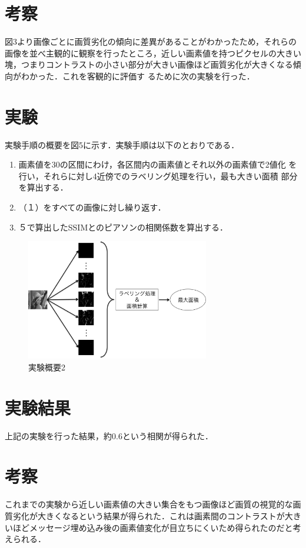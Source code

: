 \documentclass[a4j,fleqn,10pt]{jsarticle}
\begin{document}
\section{考察}
図3より画像ごとに画質劣化の傾向に差異があることがわかったため，それらの
画像を並べ主観的に観察を行ったところ，近しい画素値を持つピクセルの大きい
塊，つまりコントラストの小さい部分が大きい画像ほど画質劣化が大きくなる傾向がわかった．これを客観的に評価す
るために次の実験を行った．

\section{実験}
実験手順の概要を図5に示す．実験手順は以下のとおりである．

\begin{enumerate}
\renewcommand{\labelenumi}{(\arabic{enumi})}
 \item 画素値を30の区間にわけ，各区間内の画素値とそれ以外の画素値で2値化
       を行い，それらに対し4近傍でのラベリング処理を行い，最も大きい面積
       部分を算出する．
 \item （１）をすべての画像に対し繰り返す．
 \item ５で算出したSSIMとのピアソンの相関係数を算出する．
\end{enumerate}

\begin{figure}[htbp]
 \begin{center}
  \includegraphics[width=8cm]{experiment2.png}
 \end{center}
 \caption{実験概要2}
\end{figure}

\section{実験結果}
上記の実験を行った結果，約0.6という相関が得られた．

\section{考察}
これまでの実験から近しい画素値の大きい集合をもつ画像ほど画質の視覚的な画
質劣化が大きくなるという結果が得られた．これは画素間のコントラストが大き
いほどメッセージ埋め込み後の画素値変化が目立ちにくいため得られたのだと考
えられる．
\end{document}
